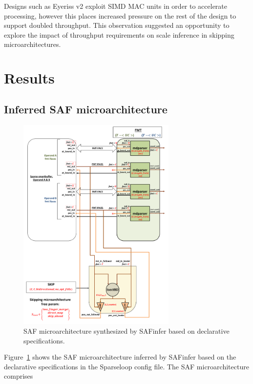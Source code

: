 Designs such as Eyeriss v2\cite{eyerissv2} exploit SIMD MAC units in order to accelerate processing, however this places increased pressure on the rest of the design to support doubled throughput. This observation suggested an opportunity to explore the impact of throughput requirements on scale inference in skipping microarchitectures.

\section{Results}

\subsection{Inferred SAF microarchitecture}

\begin{figure}[ht]
\centering
\includegraphics[width=0.7\textwidth]{figures/case_study_inferred_uarch.pdf}
\caption{SAF microarchitecture synthesized by SAFinfer based on declarative specifications.}
\label{fig:case_study_inferred_uarch}
\end{figure}

\clearpage

Figure~\ref{fig:case_study_inferred_uarch} shows the SAF microarchitecture inferred by SAFinfer based on the declarative specifications in the Sparseloop config file. The SAF microarchitecture comprises

